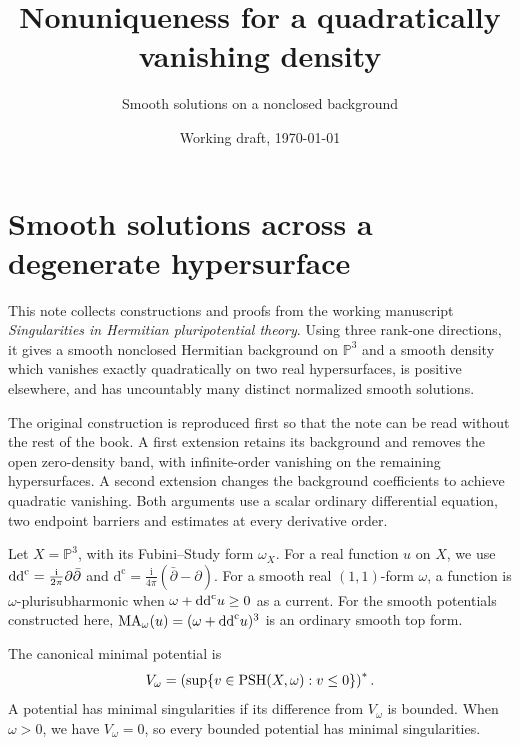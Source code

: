 
\usepackage{needspace}
\newcommand{\dc}{\mathrm d^{\mathrm c}}
\newcommand{\R}{\mathbb R}
\newcommand{\C}{\mathbb C}

\author{}
\title{Nonuniqueness for a quadratically\\vanishing density}
\subtitle{Smooth solutions on a nonclosed background}
\date{Working draft, \today}
\maketitle
\mainmatter
\chapter{Smooth solutions across a degenerate hypersurface}

This note collects constructions and proofs from the working manuscript \emph{Singularities in Hermitian pluripotential theory}. Using three rank-one directions, it gives a smooth nonclosed Hermitian background on $\mathbb P^3$ and a smooth density which vanishes exactly quadratically on two real hypersurfaces, is positive elsewhere, and has uncountably many distinct normalized smooth solutions.

The original construction is reproduced first so that the note can be read without the rest of the book. A first extension retains its background and removes the open zero-density band, with infinite-order vanishing on the remaining hypersurfaces. A second extension changes the background coefficients to achieve quadratic vanishing. Both arguments use a scalar ordinary differential equation, two endpoint barriers and estimates at every derivative order.

Let $X=\mathbb P^3$, with its Fubini--Study form $\omega_X$. For a real function $u$ on $X$, we use $\mathrm{dd}^{\mathrm{c}}=\frac{\mathrm{i}}{2\pi}\partial\bar\partial$ and $\dc=\frac{\mathrm{i}}{4\pi}(\bar\partial-\partial)$. For a smooth real $(1,1)$-form $\omega$, a function is $\omega$-plurisubharmonic when $\omega+\mathrm{dd}^{\mathrm{c}} u\geq0$ as a current. For the smooth potentials constructed here, $\mathrm{MA}_\omega(u)=(\omega+\mathrm{dd}^{\mathrm{c}} u)^3$ is an ordinary smooth top form.

\begin{definition}\label{sec:obstacle-envelopes}
The canonical minimal potential is
\[
 V_\omega=\left(\sup\{v\in\mathrm{PSH}(X,\omega):v\leq0\}\right)^*.
\]
A potential has minimal singularities if its difference from $V_\omega$ is bounded. When $\omega>0$, we have $V_\omega=0$, so every bounded potential has minimal singularities.
\end{definition}

